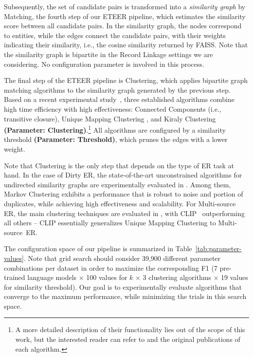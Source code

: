 
Subsequently, the set of candidate pairs 
is transformed into a \textit{similarity graph} {by Matching, the fourth step of our ETEER pipeline, which estimates the similarity score between all candidate pairs. In the similarity graph, the nodes correspond to entities, while the edges connect the candidate pairs, with their weights indicating their similarity, i.e., the cosine similarity returned by FAISS.} 
Note that the similarity graph is bipartite in the Record Linkage settings we are considering. 
No configuration parameter is involved in this process. 

The final step of the ETEER pipeline is Clustering, which applies bipartite graph matching algorithms to the similarity graph generated by the previous step. Based on a recent experimental study~\cite{DBLP:journals/vldb/PapadakisETHC23}, three established algorithms combine high time efficiency with high effectiveness: Connected Components (i.e., transitive closure), Unique Mapping Clustering \cite{DBLP:conf/kdd/Lacoste-JulienPDKGG13}, and Kiraly Clustering~\cite{DBLP:journals/algorithms/Kiraly13} \textbf{(Parameter: Clustering)}.\footnote{A more detailed description of their functionality lies out of the scope of this work, but the interested reader can refer to \cite{DBLP:journals/vldb/PapadakisETHC23} and the original publications of each algorithm.}
All algorithms are configured by 
a similarity threshold \textbf{(Parameter: Threshold)}, which prunes the edges with a lower weight.

Note that Clustering is the only step that 
depends on the type of ER task at hand. In the case of Dirty ER, the state-of-the-art unconstrained algorithms for undirected similarity graphs are experimentally evaluated in \cite{DBLP:journals/pvldb/HassanzadehCML09}. Among them, Markov Clustering exhibits a performance that is robust to noise and portion of duplicates, while achieving high effectiveness and scalability. For Multi-source ER, the main clustering techniques are evaluated in \cite{DBLP:journals/csimq/SaeediNPR18}, with CLIP~\cite{DBLP:conf/esws/SaeediPR18} outperforming all others -- CLIP essentially generalizes Unique Mapping Clustering to Multi-source~ER.

The configuration space of our pipeline is summarized in Table~\ref{tab:parameter-values}. Note that grid search should consider 39,900 different parameter combinations per dataset in order to maximize the corresponding F1 (7 pre-trained language models $\times$ 100 values for $k$ $\times$ 3 clustering algorithms $\times$ 19 values for similarity threshold). Our goal is to experimentally evaluate algorithms that converge to the maximum performance, while minimizing the trials in this search space.